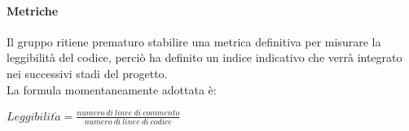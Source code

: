 \paragraph{Metriche}

Il gruppo ritiene prematuro stabilire una metrica definitiva per misurare la leggibilità del codice, perciò ha definito 
un indice indicativo che verrà integrato nei successivi stadi del progetto.\\
La formula momentaneamente adottata è:
\begin{center}
    $Leggibilit\grave{a} = \frac{numero\ di\ linee\ di\ commento}{numero\ di\ linee\ di\ codice}$
\end{center}
